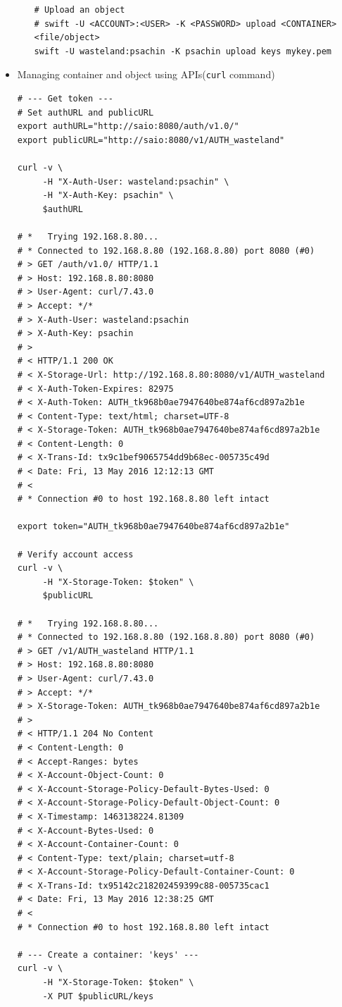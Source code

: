 \documentclass{article}
\begin{document}
\begin{itemize}
\begin{itemize}
\begin{verbatim}
# Upload an object
# swift -U <ACCOUNT>:<USER> -K <PASSWORD> upload <CONTAINER> <file/object>
swift -U wasteland:psachin -K psachin upload keys mykey.pem
\end{verbatim}
\end{itemize}
\item Managing container and object using APIs(\texttt{curl} command)
\begin{verbatim}
# --- Get token ---
# Set authURL and publicURL
export authURL="http://saio:8080/auth/v1.0/"
export publicURL="http://saio:8080/v1/AUTH_wasteland"

curl -v \
	 -H "X-Auth-User: wasteland:psachin" \
	 -H "X-Auth-Key: psachin" \
	 $authURL

# *   Trying 192.168.8.80...
# * Connected to 192.168.8.80 (192.168.8.80) port 8080 (#0)
# > GET /auth/v1.0/ HTTP/1.1
# > Host: 192.168.8.80:8080
# > User-Agent: curl/7.43.0
# > Accept: */*
# > X-Auth-User: wasteland:psachin
# > X-Auth-Key: psachin
# >
# < HTTP/1.1 200 OK
# < X-Storage-Url: http://192.168.8.80:8080/v1/AUTH_wasteland
# < X-Auth-Token-Expires: 82975
# < X-Auth-Token: AUTH_tk968b0ae7947640be874af6cd897a2b1e
# < Content-Type: text/html; charset=UTF-8
# < X-Storage-Token: AUTH_tk968b0ae7947640be874af6cd897a2b1e
# < Content-Length: 0
# < X-Trans-Id: tx9c1bef9065754dd9b68ec-005735c49d
# < Date: Fri, 13 May 2016 12:12:13 GMT
# <
# * Connection #0 to host 192.168.8.80 left intact

export token="AUTH_tk968b0ae7947640be874af6cd897a2b1e"

# Verify account access
curl -v \
	 -H "X-Storage-Token: $token" \
	 $publicURL

# *   Trying 192.168.8.80...
# * Connected to 192.168.8.80 (192.168.8.80) port 8080 (#0)
# > GET /v1/AUTH_wasteland HTTP/1.1
# > Host: 192.168.8.80:8080
# > User-Agent: curl/7.43.0
# > Accept: */*
# > X-Storage-Token: AUTH_tk968b0ae7947640be874af6cd897a2b1e
# >
# < HTTP/1.1 204 No Content
# < Content-Length: 0
# < Accept-Ranges: bytes
# < X-Account-Object-Count: 0
# < X-Account-Storage-Policy-Default-Bytes-Used: 0
# < X-Account-Storage-Policy-Default-Object-Count: 0
# < X-Timestamp: 1463138224.81309
# < X-Account-Bytes-Used: 0
# < X-Account-Container-Count: 0
# < Content-Type: text/plain; charset=utf-8
# < X-Account-Storage-Policy-Default-Container-Count: 0
# < X-Trans-Id: tx95142c218202459399c88-005735cac1
# < Date: Fri, 13 May 2016 12:38:25 GMT
# <
# * Connection #0 to host 192.168.8.80 left intact

# --- Create a container: 'keys' ---
curl -v \
	 -H "X-Storage-Token: $token" \
	 -X PUT $publicURL/keys


\end{verbatim}
\end{itemize}
\end{document}
